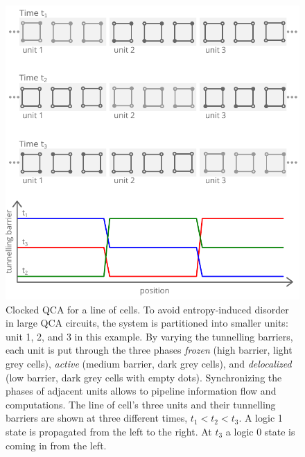 \begin{figure}
  \center
  \includegraphics{clocking}
  \caption{
Clocked QCA for a line of cells. To avoid entropy-induced disorder in large QCA
circuits, the system is partitioned into smaller units: unit 1, 2, and 3 in this
example. By varying the tunnelling barriers, each unit is put through the three
phases \emph{frozen} (high barrier, light grey cells), \emph{active} (medium
barrier, dark grey cells), and \emph{delocalized} (low barrier, dark grey cells
with empty dots). Synchronizing the phases of adjacent units allows to pipeline
information flow and computations.  The line of cell's three units and their
tunnelling barriers are shown at three different times, $t_1<t_2<t_3$. A logic 1
state is propagated from the left to the right.  At $t_3$ a logic 0 state is
coming in from the left.
}
  \label{fig:clocking}
\end{figure}

